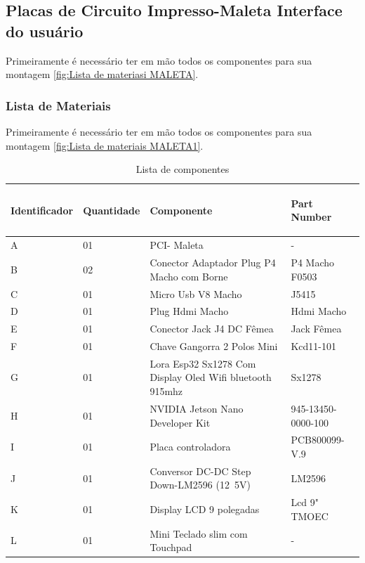 \subsection{Placas de Circuito Impresso-Maleta Interface do usuário}

\par Primeiramente é necessário ter em mão todos os componentes para sua montagem \ref{fig:Lista de materiasi MALETA}.

\subsubsection{Lista de Materiais}

\par Primeiramente é necessário ter em mão todos os componentes para sua montagem \ref{fig:Lista de materiais MALETA1}.

\begin{table}[H]
\centering
\begin{tabular}{|m{1.9cm} |m{1.8cm} |m{7.3cm}|m{4cm}|}
\hline
\begin{center}Identificador\end{center} &\begin{center} Quantidade\end{center} & \begin{center}Componente\end{center} &\begin{center} Part Number\end{center} \\\hline
A&01 &  PCI- Maleta  & -  \\\hline

B&02 & Conector Adaptador Plug P4 Macho com Borne &  P4 Macho F0503 \\\hline
C&01 & Micro Usb V8 Macho & J5415\\\hline
D&01 & Plug Hdmi Macho & Hdmi Macho \\\hline
E&01 & Conector Jack J4 DC Fêmea &  Jack Fêmea  \\\hline
F&01 & Chave Gangorra 2 Polos Mini  & Kcd11-101   \\\hline
G &01&Lora Esp32 Sx1278 Com Display  Oled Wifi bluetooth 915mhz& Sx1278 \\\hline
H & 01 & NVIDIA Jetson Nano Developer Kit  & 945-13450-0000-100\\\hline 
I & 01 &Placa controladora   & PCB800099-V.9  \\\hline 
J& 01 &  Conversor DC-DC Step Down-LM2596 (12~5V)
& LM2596 \\\hline
K &01& Display LCD 9 polegadas  & Lcd 9" TMOEC \\\hline
L& 01&Mini  Teclado  slim  com  Touchpad & -  \\\hline
\end{tabular}
\caption{Lista de componentes}
\end{table}



